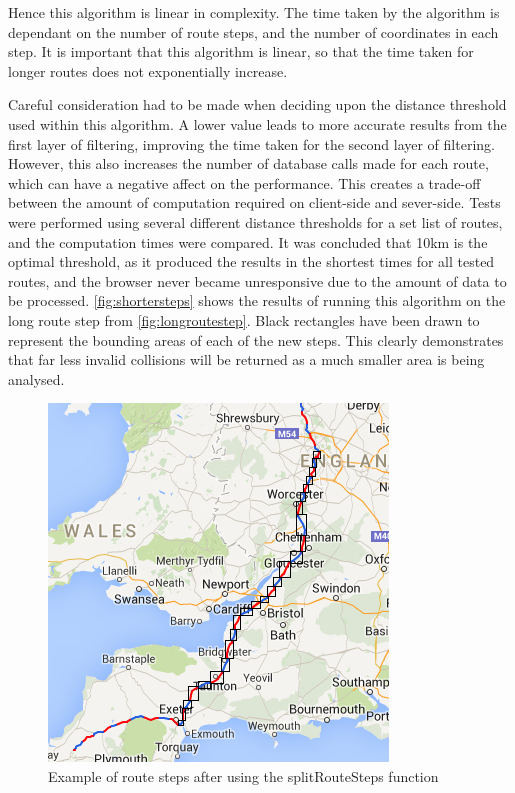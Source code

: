 \documentclass[authoryearcitations]{UoYCSproject}
\begin{document}
Hence this algorithm is linear in complexity. The time taken by the algorithm is dependant on the number of route steps, and the number of coordinates in each step. It is important that this algorithm is linear, so that the time taken for longer routes does not exponentially increase.

Careful consideration had to be made when deciding upon the distance threshold used within this algorithm. A lower value leads to more accurate results from the first layer of filtering, improving the time taken for the second layer of filtering. However, this also increases the number of database calls made for each route, which can have a negative affect on the performance. This creates a trade-off between the amount of computation required on client-side and sever-side. Tests were performed using several different distance thresholds for a set list of routes, and the computation times were compared. It was concluded that 10km is the optimal threshold, as it produced the results in the shortest times for all tested routes, and the browser never became unresponsive due to the amount of data to be processed. \autoref{fig:shortersteps} shows the results of running this algorithm on the long route step from \autoref{fig:longroutestep}. Black rectangles have been drawn to represent the bounding areas of each of the new steps. This clearly demonstrates that far less invalid collisions will be returned as a much smaller area is being analysed.

\begin{figure}
	\center
	\includegraphics[scale=0.7]{shortersteps}
	\caption{Example of route steps after using the splitRouteSteps function}
	\label{fig:shortersteps}
\end{figure}
\end{document}
